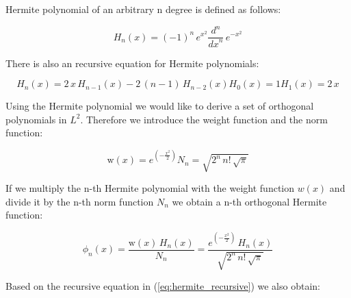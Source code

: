 \documentclass[12pt,twoside,a4paper]{article}
\numberwithin{equation}{subsection}
\numberwithin{figure}{subsection}
\begin{document}
Hermite polynomial of an arbitrary n degree is defined as follows:

\begin{equation} \label{eq:hermite_definition}
	H_n(x) = ( - 1)^{n} \, e ^ {x ^ 2} \frac { d ^ n } {{dx}^{n}} \, e^{ - x ^ 2}
\end{equation}

There is also an recursive equation for Hermite polynomials:

\begin{subequations} \label{eq:hermite_recursive}
  \begin{equation}   \label{eq:hrec_next}
    H_n (x) = 2 \, x \, H_{n - 1}(x) - 2 \, (n - 1) \, H_{n - 2}(x)
  \end{equation}
  \begin{equation}   \label{eq:hrec_first}
    H_0 (x) = 1
  \end{equation}
  \begin{equation}   \label{eq:hrec_second}
    H_1 (x) = 2 \, x
  \end{equation}
\end{subequations}

Using the Hermite polynomial we would like to derive a set of orthogonal polynomials in $L ^ 2$. Therefore we introduce the
weight function and the norm function:

\begin{subequations} \label{eq:hermite_weight}
  \begin{equation}   \label{eq:hwht_weight}
    \mathrm{w}(x) = e^{( - \frac {x^{2}}{2})}
  \end{equation}
  \begin{equation}   \label{eq:hwht_iter}
    N_n = \sqrt{2^{n} \, n\mathrm{!} \, \sqrt{\pi }}
  \end{equation}
\end{subequations}

If we multiply the n-th Hermite polynomial with the weight function $w(x)$ and divide it by the n-th norm function $N_n$ we
obtain a n-th orthogonal Hermite function:

\begin{equation} \label{eq:hermite_orthogonal}
  \phi_n (x) = \frac {\mathrm{w}(x) \, H_n (x)} {N_n} 
  	= \frac {e^{( - \frac {x ^ 2}{2})} \, H_n (x)} {\sqrt{2^{n} \, n\mathrm{!} \, \sqrt {\pi }}}
\end{equation}

Based on the recursive equation in (\ref{eq:hermite_recursive}) we also obtain:
\end{document}
